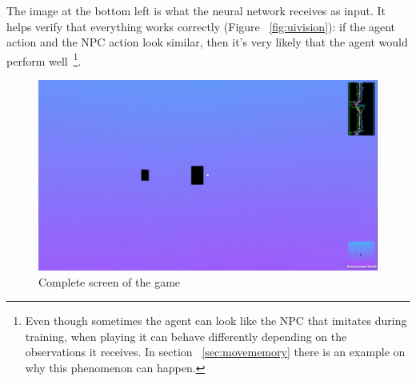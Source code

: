 The image at the bottom left is what the neural network receives as input. It helps verify that everything works correctly (Figure ~\ref{fig:uivision}): if the agent action and the NPC action look similar, then it's very likely that the agent would perform well~\footnote{Even though sometimes the agent can look like the NPC that imitates during training, when playing it can behave differently depending on the observations it receives. In section ~\ref{sec:movememory} there is an example on why this phenomenon can happen. }.
\begin{figure}[h]
  \centering
		\includegraphics[width=.9\textwidth]{img/uiComplete.png}
  \caption{Complete screen of the game}
  \label{fig:uicomp}
\end{figure}

